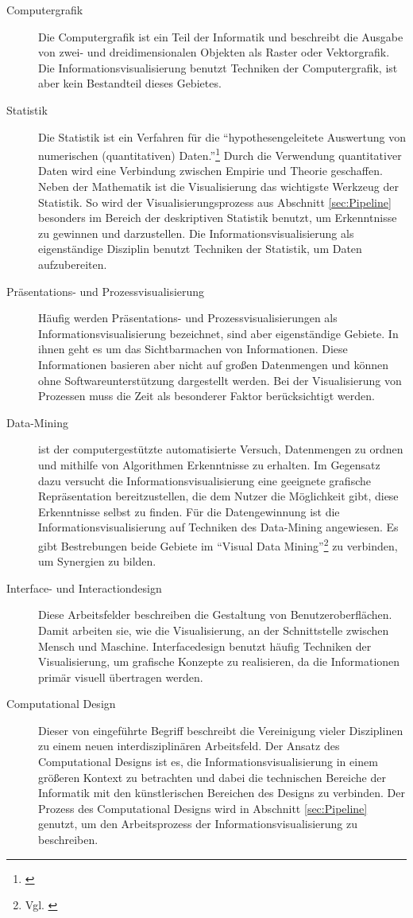 \documentclass[a4paper, 
               12pt,
               DIV=calc,
               version=first,
               pdftex,
               headsepline,
               footsepline,
               bibliography=totocnumbered,
               listof=numbered]{scrreprt}
\begin{document}
\begin{description}
\item[Computergrafik]
Die Computergrafik ist ein Teil der Informatik und beschreibt die Ausgabe von zwei- und dreidimensionalen
Objekten als Raster oder Vektorgrafik. Die Informationsvisualisierung benutzt Techniken der Computergrafik, ist aber kein
Bestandteil dieses Gebietes.
\item[Statistik]
Die Statistik ist ein Verfahren für die "`hypothesengeleitete Auswertung von numerischen (quantitativen)
Daten."'\footnote{\citep[S.\,23]{Statistik}} Durch die Verwendung quantitativer Daten wird eine Verbindung zwischen
Empirie und Theorie geschaffen.  Neben der Mathematik ist die Visualisierung das wichtigste
Werkzeug der Statistik. So wird der Visualisierungsprozess aus Abschnitt \ref{sec:Pipeline} besonders
im Bereich der deskriptiven Statistik benutzt, um Erkenntnisse zu gewinnen und darzustellen.
Die Informationsvisualisierung als eigenständige Disziplin benutzt Techniken der Statistik, um Daten aufzubereiten.
\item[Präsentations- und Prozessvisualisierung]
Häufig werden Präsentations- und Prozessvisualisierungen als Informationsvisualisierung bezeichnet, sind
aber eigenständige Gebiete. In ihnen geht es um das Sichtbarmachen von Informationen. Diese Informationen basieren aber nicht auf
großen Datenmengen und können ohne Softwareunterstützung dargestellt werden. Bei der Visualisierung
von Prozessen muss die Zeit als besonderer Faktor berücksichtigt werden.
\item[Data-Mining] ist der computergestützte automatisierte Versuch, Datenmengen zu ordnen und mithilfe
von Algorithmen Erkenntnisse zu erhalten. Im Gegensatz dazu versucht die Informationsvisualisierung eine geeignete
grafische Repräsentation
bereitzustellen, die dem Nutzer die Möglichkeit gibt, diese Erkenntnisse selbst zu finden. Für die Datengewinnung
ist die Informationsvisualisierung auf Techniken des Data-Mining angewiesen. Es gibt Bestrebungen beide Gebiete 
im "`Visual Data Mining"'\footnote{Vgl. \citep{Keim}} zu verbinden, um Synergien zu bilden.
\item[Interface- und Interactiondesign]
Diese Arbeitsfelder beschreiben die Gestaltung von Benutzeroberflächen. Damit arbeiten sie, wie die Visualisierung, an
der Schnittstelle zwischen Mensch und Maschine. Interfacedesign benutzt häufig Techniken der Visualisierung,
um grafische Konzepte zu realisieren, da die Informationen primär visuell übertragen werden.
\item[Computational Design]
Dieser von \cite{BenFry} eingeführte Begriff beschreibt die Vereinigung vieler Disziplinen zu einem neuen
interdisziplinären Arbeitsfeld. Der Ansatz des Computational Designs ist es, die Informationsvisualisierung in einem größeren
Kontext zu betrachten und dabei die technischen Bereiche der Informatik mit den künstlerischen
Bereichen des Designs zu verbinden. Der Prozess des Computational Designs wird in Abschnitt \ref{sec:Pipeline}
genutzt, um den Arbeitsprozess der Informationsvisualisierung zu beschreiben.
\end{description}
\end{document}
